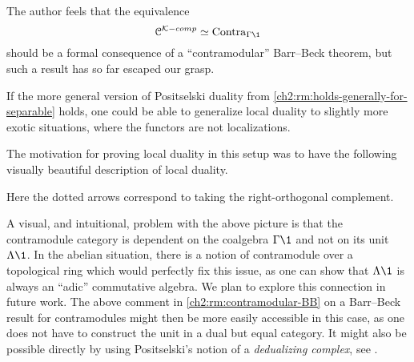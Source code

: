 \begin{remark}
    \label{ch2:rm:contramodular-BB}
    The author feels that the equivalence 
    \[\C^{\K-comp}\simeq \Contra_{\Gamma\1}\] 
    should be a formal consequence of a ``contramodular'' Barr--Beck theorem, but such a result has so far escaped our grasp. 
\end{remark}

\begin{remark}
    If the more general version of Positselski duality from \cref{ch2:rm:holds-generally-for-separable} holds, one could be able to generalize local duality to slightly more exotic situations, where the functors are not localizations. 
\end{remark}

The motivation for proving local duality in this setup was to have the following visually beautiful description of local duality. 

\begin{center}
\end{center}

Here the dotted arrows correspond to taking the right-orthogonal complement. 

\begin{remark}
    \label{ch2:rm:contramodule-over-pro-ring}
    A visual, and intuitional, problem with the above picture is that the contramodule category is dependent on the coalgebra $\Gamma\1$ and not on its unit $\Lambda \1$. In the abelian situation, there is a notion of contramodule over a topological ring which would perfectly fix this issue, as one can show that $\Lambda \1$ is always an ``adic'' commutative algebra. We plan to explore this connection in future work. The above comment in \cref{ch2:rm:contramodular-BB} on a Barr--Beck result for contramodules might then be more easily accessible in this case, as one does not have to construct the unit in a dual but equal category. It might also be possible directly by using Positselski's notion of a \emph{dedualizing complex}, see \cite{positselski_2016}. 
\end{remark}

